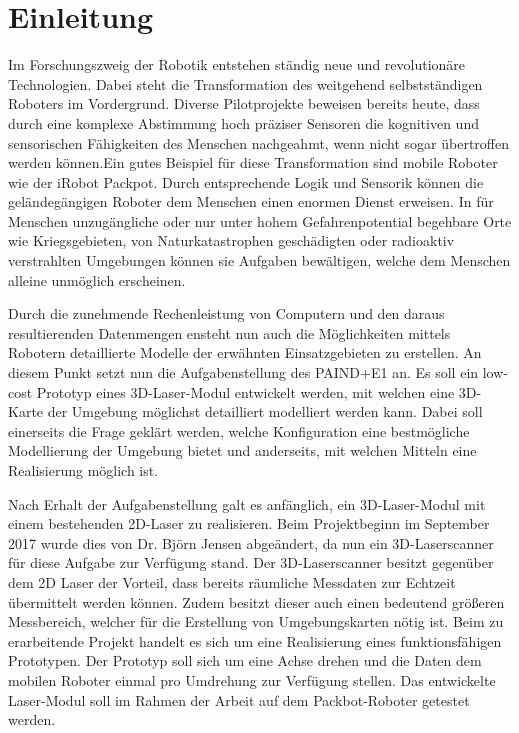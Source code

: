 
\chapter*{Einleitung}


Im Forschungszweig der Robotik entstehen ständig neue und revolutionäre Technologien. Dabei steht die Transformation des weitgehend selbstständigen Roboters im Vordergrund. Diverse Pilotprojekte beweisen bereits heute, dass durch eine komplexe Abstimmung hoch präziser Sensoren die kognitiven und sensorischen Fähigkeiten des Menschen nachgeahmt, wenn nicht sogar übertroffen werden können.Ein gutes Beispiel für diese Transformation sind mobile Roboter wie der iRobot Packpot. Durch entsprechende Logik und Sensorik können die geländegängigen Roboter dem Menschen einen enormen Dienst erweisen. In für Menschen unzugängliche oder nur unter hohem Gefahrenpotential begehbare Orte wie Kriegsgebieten, von Naturkatastrophen geschädigten oder radioaktiv verstrahlten Umgebungen können sie Aufgaben bewältigen, welche dem Menschen alleine unmöglich erscheinen.

Durch die zunehmende Rechenleistung von Computern und den daraus resultierenden Datenmengen ensteht nun auch die Möglichkeiten mittels Robotern detaillierte Modelle der erwähnten Einsatzgebieten zu erstellen. An diesem Punkt setzt nun die Aufgabenstellung des PAIND+E1 an. Es soll ein low-cost Prototyp eines 3D-Laser-Modul entwickelt werden, mit welchen eine 3D-Karte der Umgebung möglichst detailliert modelliert werden kann. Dabei soll einerseits die Frage geklärt werden, welche Konfiguration eine bestmögliche Modellierung der Umgebung bietet und anderseits, mit welchen Mitteln eine Realisierung möglich ist.

Nach Erhalt der Aufgabenstellung galt es anfänglich, ein 3D-Laser-Modul mit einem bestehenden 2D-Laser zu realisieren. Beim Projektbeginn im September 2017 wurde dies von Dr. Björn Jensen abgeändert, da nun ein 3D-Laserscanner für diese Aufgabe zur Verfügung stand. Der 3D-Laserscanner besitzt gegenüber dem 2D Laser der Vorteil, dass bereits räumliche Messdaten zur Echtzeit übermittelt werden können. Zudem besitzt dieser auch einen bedeutend größeren Messbereich, welcher für die Erstellung von Umgebungskarten nötig ist. Beim zu erarbeitende Projekt handelt es sich um eine Realisierung eines funktionsfähigen Prototypen. Der Prototyp soll sich um eine Achse drehen und die Daten dem mobilen Roboter einmal pro Umdrehung zur Verfügung stellen. Das entwickelte Laser-Modul soll im Rahmen der Arbeit auf dem Packbot-Roboter getestet werden.


